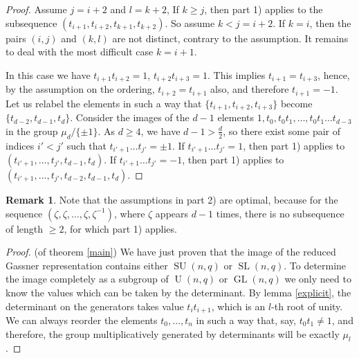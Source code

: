 \documentclass{article}
\theoremstyle{definition}
\newtheorem*{remark}{Remark}
\DeclareMathOperator{\GL}{\mathrm{GL}}
\DeclareMathOperator{\U}{\mathrm{U}}
\DeclareMathOperator{\SU}{\mathrm{SU}}
\DeclareMathOperator{\SL}{\mathrm{SL}}
\begin{document}
\begin{proof}
		Assume $j=i+2$ and $l=k+2$, If $k \geq j$, then part 1) applies to the subsequence $(t_{i+1}, t_{i+2}, t_{k+1}, t_{k+2})$. So assume $k < j = i+2$. If $k=i$, then the pairs $(i,j)$ and $(k,l)$ are not distinct, contrary to the assumption. It remains to deal with the most difficult case $k=i+1$.\par 
		In this case we have $t_{i+1}t_{i+2}=1$, $t_{i+2}t_{i+3}=1$. This implies $t_{i+1}=t_{i+3}$, hence, by the assumption on the ordering, $t_{i+2}=t_{i+1}$ also, and therefore $t_{i+1}=-1$. Let us relabel the elements in such a way that $\{t_{i+1}, t_{i+2}, t_{i+3}\}$ become $\{t_{d-2}, t_{d-1}, t_d\}$. Consider the images of the $d-1$ elements $1, t_0, t_0t_1, \ldots, t_0t_1 \ldots t_{d-3}$ in the group $\mu_d / \{\pm 1 \}$. As $d \ge 4$, we have $d-1 > \frac{d}{2}$, so there exist some pair of indices $i' < j'$ such that $t_{i'+1} \ldots t_{j'} = \pm 1$. If $t_{i'+1} \ldots t_{j'} = 1$, then part 1) applies to $(t_{i'+1}, \ldots, t_{j'}, t_{d-1}, t_d)$. If $t_{i'+1} \ldots t_{j'} = -1$, then part 1) applies to $(t_{i'+1}, \ldots, t_{j'}, t_{d-2}, t_{d-1}, t_d)$.
	\end{proof}
	\begin{remark}
		Note that the assumptions in part 2) are optimal, because for the sequence $(\zeta, \zeta, \ldots, \zeta, \zeta^{-1})$, where $\zeta$ appears $d-1$ times, there is no subsequence of length $\geq 2$, for which part 1) applies.
	\end{remark}
	\begin{proof} (of theorem \ref{main})
		We have just proven that the image of the reduced Gassner representation contains either $\SU(n,q)$ or $\SL(n,q)$. To determine the image completely as a subgroup of $\U(n,q)$ or $\GL(n,q)$ we only need to know the values which can be taken by the determinant. By lemma \ref{explicit}, the determinant on the generators takes value $t_it_{i+1}$, which is an $l$-th root of unity. We can always reorder the elements $t_0, \ldots, t_n$ in such a way that, say, $t_0 t_1 \neq 1$, and therefore, the group multiplicatively generated by determinants will be exactly $\mu_l$.
	\end{proof}
\end{document}
